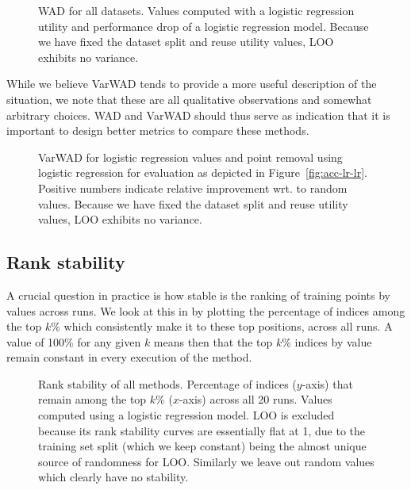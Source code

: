 \documentclass[10pt]{article}
\begin{document}
\begin{figure}[h]
  \caption{\label{fig:wad-lr-lr}WAD for all datasets. Values computed with a
  logistic regression utility and performance drop of a logistic regression
  model. Because we have fixed the dataset split and reuse utility values, LOO
  exhibits no variance.}
\end{figure}

While we believe VarWAD tends to provide a more useful description of the
situation, we note that these are all qualitative observations and somewhat
arbitrary choices. WAD and VarWAD should thus serve as indication that it is
important to design better metrics to compare these methods.

\begin{figure}[h]
  \caption{\label{fig:varwad-lr-lr}VarWAD for logistic regression values and
  point removal using logistic regression for evaluation as depicted in 
  Figure~\ref{fig:acc-lr-lr}. Positive numbers indicate relative improvement
  wrt. to random values. Because we have fixed the dataset split and reuse
  utility values, LOO exhibits no variance.}
\end{figure}

\subsection{Rank stability}\label{sec:rank-stability}

A crucial question in practice is how stable is the ranking of training points
by values across runs. We look at this in  by
plotting the percentage of indices among the top $k$\% which consistently make
it to these top positions, across all runs. A value of 100\% for any given $k$
means then that the top $k$\% indices by value remain constant in every
execution of the method.

\begin{figure}[h]
  \caption{\label{fig:rank-stability}Rank stability of all methods. Percentage
  of indices ($y$-axis) that remain among the top $k$\% ($x$-axis) across all
  20 runs. Values computed using a logistic regression model. LOO is excluded
  because its rank stability curves are essentially flat at 1, due to the
  training set split (which we keep constant) being the almost unique source
  of randomness for LOO. Similarly we leave out random values which clearly
  have no stability.}
\end{figure}
\end{document}
